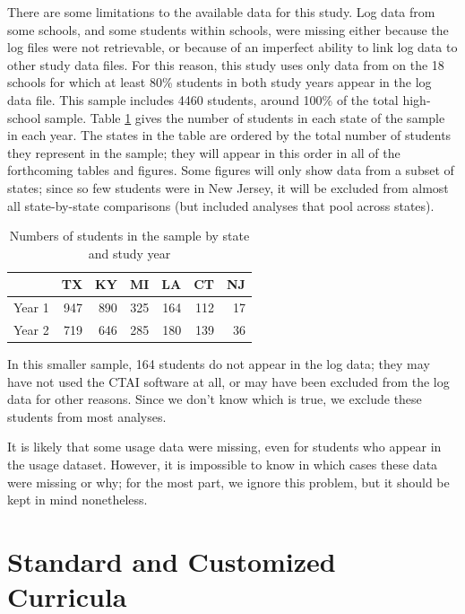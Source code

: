 \documentclass[12pt]{article}\usepackage[]{graphicx}\usepackage[]{color}
\begin{document}
There are some limitations to the available data for this study.
Log data from some schools, and some students within schools, were
missing either because the log files were not retrievable, or because
of an imperfect ability to link log data to other study data files.
For this reason, this study uses only data from on the
18 schools for which at least 80\%
students in both study years appear in the log data file.
This sample includes 4460 students, around
100\%
of the total high-school sample.
Table \ref{tab:nByState} gives the number of students in each state of
the sample in each year.
The states in the table are ordered by the total number of students
they represent in the sample; they will appear in this order in
all of the forthcoming tables and figures.
Some figures will only show data from a subset of states; since so few
students were in New Jersey, it will be excluded from almost all
state-by-state comparisons (but included analyses that pool across states).
\begin{table}[ht]
\centering
\begin{tabular}{rrrrrrr}
  \hline
 & TX & KY & MI & LA & CT & NJ \\ 
  \hline
Year 1 & 947 & 890 & 325 & 164 & 112 &  17 \\ 
  Year 2 & 719 & 646 & 285 & 180 & 139 &  36 \\ 
   \hline
\end{tabular}
\caption{Numbers of students in the sample by state and study year} 
\label{tab:nByState}
\end{table}


In this smaller sample, 164
students do not appear in the log data; they may have not used the CTAI
software at all, or may have been excluded from the log data for other
reasons.
Since we don't know which is true, we exclude these students from most
analyses.

It is likely that some usage data were missing, even for students who
appear in the usage dataset.
However, it is impossible to know in which cases these data were
missing or why; for the most part, we ignore this problem, but it
should be kept in mind nonetheless.

\section{Standard and Customized Curricula}\label{sec:curricula}
\end{document}
